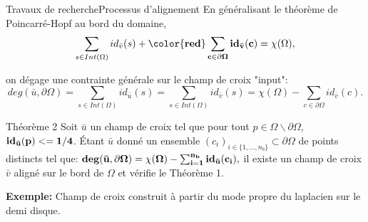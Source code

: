 \documentclass[compress,10pt,aspectratio=169]{beamer}
\begin{document}
\begin{frame}{Travaux de recherche}{Processus d'alignement}
\vspace{-0.2cm}
\small
En généralisant le théorème de Poincarré-Hopf au bord du domaine,
\begin{equation*}
\sum_{s\in Int(\Omega)} id_{\bar{v}}(s)+{\bf \color{red}\sum_{c\in \partial\Omega} id_{\bar{v}}(c)} = \chi(\Omega),
\label{poincareformula_3}
\end{equation*}

on dégage une contrainte générale sur le champ de croix "input":
\begin{equation*}
deg(\bar{u}, \partial\Omega) =\sum_{s\in Int(\Omega)} id_{\bar{u}}(s) = \sum_{s\in Int(\Omega)} id_{\bar{v}}(s) = \chi(\Omega)-\sum_{c\in \partial \Omega} id_{\bar{v}}(c).
\label{third_u_c}
\end{equation*}
\begin{onerablock}{Théorème 2}
Soit $\bar{u}$ un champ de croix tel que pour tout $p\in\Omega\backslash\partial\Omega$, ${\bf id_{\bar{u}}(p)<=1/4}$. \'Etant $\bar{u}$ donné un ensemble $(c_i)_{i\in\{1,\dots,n_b\}}\subset\partial\Omega$ de points distincts tel que:
$
{\bf deg(\bar{u}, \partial\Omega) = \chi(\Omega)-\sum_{i=1}^{n_b} id_{\bar{u}}(c_i),}
$
il existe un champ de croix $\bar{v}$ aligné sur le bord de $\Omega$ et vérifie le Théorème 1.
\end{onerablock}
\vspace{0.1cm}
{\bf Exemple:} Champ de croix construit à partir du mode propre du laplacien sur le demi disque.
\end{frame}
\end{document}

